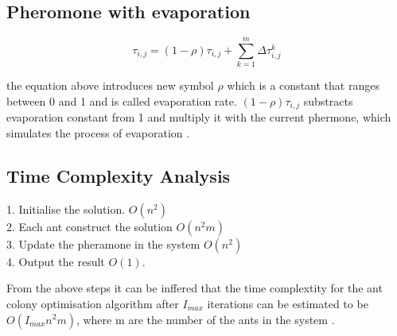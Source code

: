 \documentclass{article}
\begin{document}
\subsection*{Pheromone with evaporation}
\begin{equation}
	\tau_{i, j} = (1-\rho) \tau_{i,j} + \sum_{k=1}^m \Delta{\tau_{i, j} ^k}
\end{equation} 

the equation above introduces new symbol ${\rho}$ which is a constant that ranges between 0 and 1 and is called evaporation rate. ${(1-\rho) \tau_{i,j}}$ substracts evaporation constant from 1 and multiply it with the current phermone, which simulates the process of evaporation \citep*{4129846}.

\subsection*{Time Complexity Analysis}

1. Initialise the solution. ${O(n^2)}$ \\
2. Each ant construct the solution ${O(n^2 m)}$ \\
3. Update the pheramone in the system ${O(n^2)}$ \\
4. Output the result ${O(1)}$.

From the above steps it can be inffered that the time complextity for the ant colony optimisation algorithm after $I_{max}$ iterations can be estimated to be 
${O(I_{max} n^2 m)}$, where m are the number of the ants in the system \citep*{7375763}.


 
\end{document}
